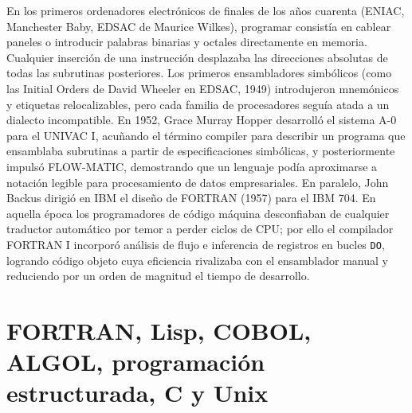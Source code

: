 \documentclass{book}
\begin{document}
En los primeros ordenadores electrónicos de finales de los años cuarenta (ENIAC, Manchester Baby, EDSAC de Maurice Wilkes), programar consistía en cablear paneles o introducir palabras binarias y octales directamente en memoria. Cualquier inserción de una instrucción desplazaba las direcciones absolutas de todas las subrutinas posteriores. Los primeros ensambladores simbólicos (como las Initial Orders de David Wheeler en EDSAC, 1949) introdujeron mnemónicos y etiquetas relocalizables, pero cada familia de procesadores seguía atada a un dialecto incompatible.
En 1952, Grace Murray Hopper desarrolló el sistema A-0 para el UNIVAC I, acuñando el término compiler para describir un programa que ensamblaba subrutinas a partir de especificaciones simbólicas, y posteriormente impulsó FLOW-MATIC, demostrando que un lenguaje podía aproximarse a notación legible para procesamiento de datos empresariales. En paralelo, John Backus dirigió en IBM el diseño de FORTRAN (1957) para el IBM 704. En aquella época los programadores de código máquina desconfiaban de cualquier traductor automático por temor a perder ciclos de CPU; por ello el compilador FORTRAN I incorporó análisis de flujo e inferencia de registros en bucles \texttt{DO}, logrando código objeto cuya eficiencia rivalizaba con el ensamblador manual y reduciendo por un orden de magnitud el tiempo de desarrollo.

\section{FORTRAN, Lisp, COBOL, ALGOL, programación estructurada, C y Unix}
\end{document}
